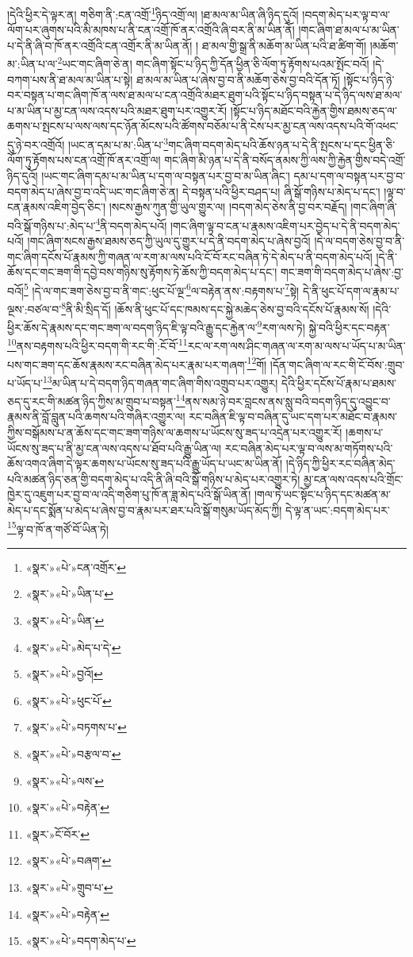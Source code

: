 །དེའི་ཕྱིར་དེ་ལྟར་ན། གཅིག་ནི་:ངན་འགྲོ་\footnote{«སྣར་»«པེ་»ངན་འགྲོར་}ཉིད་འགྲོ་ལ། །ཐ་མལ་མ་ཡིན་ཞི་ཉིད་དུའོ། །བདག་མེད་པར་ལྟ་བ་ལ་ལོག་པར་ཞུགས་པའི་མི་མཁས་པ་ནི་ངན་འགྲོ་ཁོ་ནར་འགྲོའི་ཞི་བར་ནི་མ་ཡིན་ནོ། །གང་ཞིག་ཐ་མལ་པ་མ་ཡིན་པ་དེ་ནི་ཞི་བ་ཁོ་ནར་འགྲོའི་ངན་འགྲོར་ནི་མ་ཡིན་ནོ། །
ཐ་མལ་གྱི་སྒྲ་ནི་མཆོག་མ་ཡིན་པའི་ཐ་ཚིག་གོ། །མཆོག་མ་:ཡིན་པ་ལ་\footnote{«སྣར་»«པེ་»ཡིན་པ་}ཡང་གང་ཞིག་ཅེ་ན། གང་ཞིག་སྟོང་པ་ཉིད་ཀྱི་དོན་ཕྱིན་ཅི་ལོག་ཏུ་རྟོགས་པའམ་སྤོང་བའོ། །དེ་བཀག་པས་ནི་ཐ་མལ་མ་ཡིན་པ་སྟེ། ཐ་མལ་མ་ཡིན་པ་ཞེས་བྱ་བ་ནི་མཆོག་ཅེས་བྱ་བའི་དོན་ཏོ། །སྟོང་པ་ཉིད་ཉེ་བར་བསྟན་པ་གང་ཞིག་ཁོ་ན་ལས་ཐ་མལ་པ་ངན་འགྲོའི་མཐར་ཐུག་པའི་སྟོང་པ་ཉིད་བསྟན་པ་དེ་ཉིད་ལས་ཐ་མལ་པ་མ་ཡིན་པ་མྱ་ངན་ལས་འདས་པའི་མཐར་ཐུག་པར་འགྱུར་རོ། །སྟོང་པ་ཉིད་མཐོང་བའི་རྐྱེན་གྱིས་ཐམས་ཅད་ལ་ཆགས་པ་སྤངས་པ་ལས་ལས་དང་ཉོན་མོངས་པའི་ཚོགས་བཅོམ་པ་ནི་ངེས་པར་མྱ་ངན་ལས་འདས་པའི་གོ་འཕང་དུ་ཉེ་བར་འགྲོའོ། །ཡང་ན་དམ་པ་མ་:ཡིན་པ་\footnote{«སྣར་»«པེ་»ཡིན་}གང་ཞིག་བདག་མེད་པའི་ཆོས་ཉན་པ་དེ་ནི་སྤངས་པ་དང་ཕྱིན་ཅི་ལོག་ཏུ་རྟོགས་པས་ངན་འགྲོ་ཁོ་ནར་འགྲོ་ལ། གང་ཞིག་མི་ཉན་པ་དེ་ནི་བསོད་ནམས་ཀྱི་ལས་ཀྱི་རྐྱེན་གྱིས་བདེ་འགྲོ་ཉིད་དུའོ། །ཡང་གང་ཞིག་དམ་པ་མ་ཡིན་པ་དག་ལ་བསྟན་པར་བྱ་བ་མ་ཡིན་ཞིང་། དམ་པ་དག་ལ་བསྟན་པར་བྱ་བ་བདག་མེད་པ་ཞེས་བྱ་བ་འདི་ཡང་གང་ཞིག་ཅེ་ན། དེ་བསྟན་པའི་ཕྱིར་བཤད་པ། ཞི་སྒོ་གཉིས་པ་མེད་པ་དང་། །ལྟ་བ་ངན་རྣམས་འཇིག་བྱེད་ཅིང་། །སངས་རྒྱས་ཀུན་གྱི་ཡུལ་གྱུར་ལ། །བདག་མེད་ཅེས་ནི་བྱ་བར་བརྗོད། །གང་ཞིག་ཞི་བའི་སྒོ་གཉིས་པ་:མེད་པ་\footnote{«སྣར་»«པེ་»མེད་པ་དེ་}ནི་བདག་མེད་པའོ། །གང་ཞིག་ལྟ་བ་ངན་པ་རྣམས་འཇིག་པར་བྱེད་པ་དེ་ནི་བདག་མེད་པའོ། །གང་ཞིག་སངས་རྒྱས་ཐམས་ཅད་ཀྱི་ཡུལ་དུ་གྱུར་པ་དེ་ནི་བདག་མེད་པ་ཞེས་བྱའོ། །དེ་ལ་བདག་ཅེས་བྱ་བ་ནི་གང་ཞིག་དངོས་པོ་རྣམས་ཀྱི་གཞན་ལ་རག་མ་ལས་པའི་ངོ་བོ་རང་བཞིན་ཏེ་དེ་མེད་པ་ནི་བདག་མེད་པའོ། །དེ་ནི་ཆོས་དང་གང་ཟག་གི་དབྱེ་བས་གཉིས་སུ་རྟོགས་ཏེ་ཆོས་ཀྱི་བདག་མེད་པ་དང་། གང་ཟག་གི་བདག་མེད་པ་ཞེས་:བྱ་བའོ།\footnote{«སྣར་»«པེ་»བྱའོ།} །དེ་ལ་གང་ཟག་ཅེས་བྱ་བ་ནི་གང་:ཕུང་པོ་ལྔ་\footnote{«སྣར་»«པེ་»ཕུང་པོ་}ལ་བརྟེན་ནས་:བརྟགས་པ་\footnote{«སྣར་»«པེ་»བཏགས་པ་}སྟེ། དེ་ནི་ཕུང་པོ་དག་ལ་རྣམ་པ་ལྔས་:བཙལ་བ་\footnote{«སྣར་»«པེ་»བརྩལ་བ་}ནི་མི་སྲིད་དོ། །ཆོས་ནི་ཕུང་པོ་དང་ཁམས་དང་སྐྱེ་མཆེད་ཅེས་བྱ་བའི་དངོས་པོ་རྣམས་སོ། །དེའི་ཕྱིར་ཆོས་དེ་རྣམས་དང་གང་ཟག་ལ་བདག་ཉིད་ཇི་ལྟ་བའི་རྒྱུ་དང་རྐྱེན་ལ་\footnote{«སྣར་»«པེ་»ལས་}རག་ལས་ཏེ། སྐྱེ་བའི་ཕྱིར་དང་བརྟན་\footnote{«སྣར་»«པེ་»བརྟེན་}ནས་བརྟགས་པའི་ཕྱིར་བདག་གི་རང་གི་:ངོ་བོ་\footnote{«སྣར་»ངོ་བོར་}རང་ལ་རག་ལས་ཤིང་གཞན་ལ་རག་མ་ལས་པ་ཡོད་པ་མ་ཡིན་པས་གང་ཟག་དང་ཆོས་རྣམས་རང་བཞིན་མེད་པར་རྣམ་པར་གཞག་\footnote{«སྣར་»«པེ་»བཞག་}གོ། །དོན་གང་ཞིག་ལ་རང་གི་ངོ་བོས་:གྲུབ་པ་ཡོད་པ་\footnote{«སྣར་»«པེ་»གྲུབ་པ་}མ་ཡིན་པ་དེ་བདག་ཉིད་གཞན་གང་ཞིག་གིས་འགྲུབ་པར་འགྱུར། དེའི་ཕྱིར་དངོས་པོ་རྣམ་པ་ཐམས་ཅད་དུ་རང་གི་མཚན་ཉིད་ཀྱིས་མ་གྲུབ་པ་བསྟན་\footnote{«སྣར་»«པེ་»བརྟེན་}ནས་སམ་ཉེ་བར་བླངས་ནས་སླུ་བའི་བདག་ཉིད་དུ་འབྱུང་བ་རྣམས་ནི་བློ་བླུན་པའི་ཆགས་པའི་གཞིར་འགྱུར་ལ། རང་བཞིན་ཇི་ལྟ་བ་བཞིན་དུ་ཡང་དག་པར་མཐོང་བ་རྣམས་ཀྱིས་བསྒོམས་པ་ན་ཆོས་དང་གང་ཟག་གཉིས་ལ་ཆགས་པ་ཡོངས་སུ་ཟད་པ་འདྲེན་པར་འགྱུར་རོ། །ཆགས་པ་ཡོངས་སུ་ཟད་པ་ནི་མྱ་ངན་ལས་འདས་པ་ཐོབ་པའི་རྒྱུ་ཡིན་ལ། རང་བཞིན་མེད་པར་ལྟ་བ་ལས་མ་གཏོགས་པའི་ཆོས་འགའ་ཞིག་དེ་ལྟར་ཆགས་པ་ཡོངས་སུ་ཟད་པའི་རྒྱུ་ཡོད་པ་ཡང་མ་ཡིན་ནོ། །དེ་ཉིད་ཀྱི་ཕྱིར་རང་བཞིན་མེད་པའི་མཚན་ཉིད་ཅན་གྱི་བདག་མེད་པ་འདི་ནི་ཞི་བའི་སྒོ་གཉིས་པ་མེད་པར་འགྱུར་ཏེ། མྱ་ངན་ལས་འདས་པའི་གྲོང་ཁྱེར་དུ་འཇུག་པར་བྱ་བ་ལ་འདི་གཅིག་པུ་ཁོ་ན་ཟླ་མེད་པའི་སྒོ་ཡིན་ནོ། །གལ་ཏེ་ཡང་སྟོང་པ་ཉིད་དང་མཚན་མ་མེད་པ་དང་སྨོན་པ་མེད་པ་ཞེས་བྱ་བ་རྣམ་པར་ཐར་པའི་སྒོ་གསུམ་ཡོད་མོད་ཀྱི། དེ་ལྟ་ན་ཡང་:བདག་མེད་པར་\footnote{«སྣར་»«པེ་»བདག་མེད་པ་}ལྟ་བ་ཁོ་ན་གཙོ་བོ་ཡིན་ཏེ། 